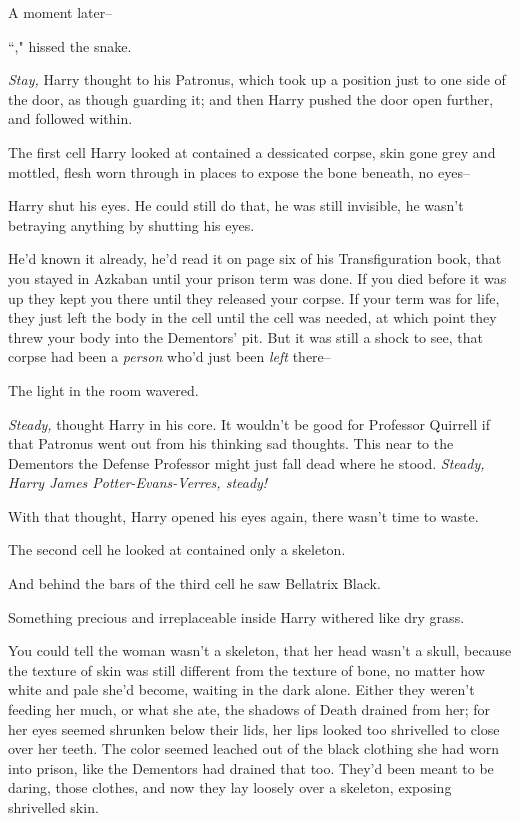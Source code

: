 A moment later\---

``," hissed the snake.

\emph{Stay,} Harry thought to his Patronus, which took up a position just to one side of the door, as though guarding it; and then Harry pushed the door open further, and followed within.

The first cell Harry looked at contained a dessicated corpse, skin gone grey and mottled, flesh worn through in places to expose the bone beneath, no eyes\---

Harry shut his eyes. He could still do that, he was still invisible, he wasn't betraying anything by shutting his eyes.

He'd known it already, he'd read it on page six of his Transfiguration book, that you stayed in Azkaban until your prison term was done. If you died before it was up they kept you there until they released your corpse. If your term was for life, they just left the body in the cell until the cell was needed, at which point they threw your body into the Dementors' pit. But it was still a shock to see, that corpse had been a \emph{person} who'd just been \emph{left} there\---

The light in the room wavered.

\emph{Steady,} thought Harry in his core. It wouldn't be good for Professor Quirrell if that Patronus went out from his thinking sad thoughts. This near to the Dementors the Defense Professor might just fall dead where he stood. \emph{Steady, Harry James Potter-Evans-Verres, steady!}

With that thought, Harry opened his eyes again, there wasn't time to waste.

The second cell he looked at contained only a skeleton.

And behind the bars of the third cell he saw Bellatrix Black.

Something precious and irreplaceable inside Harry withered like dry grass.

You could tell the woman wasn't a skeleton, that her head wasn't a skull, because the texture of skin was still different from the texture of bone, no matter how white and pale she'd become, waiting in the dark alone. Either they weren't feeding her much, or what she ate, the shadows of Death drained from her; for her eyes seemed shrunken below their lids, her lips looked too shrivelled to close over her teeth. The color seemed leached out of the black clothing she had worn into prison, like the Dementors had drained that too. They'd been meant to be daring, those clothes, and now they lay loosely over a skeleton, exposing shrivelled skin.

